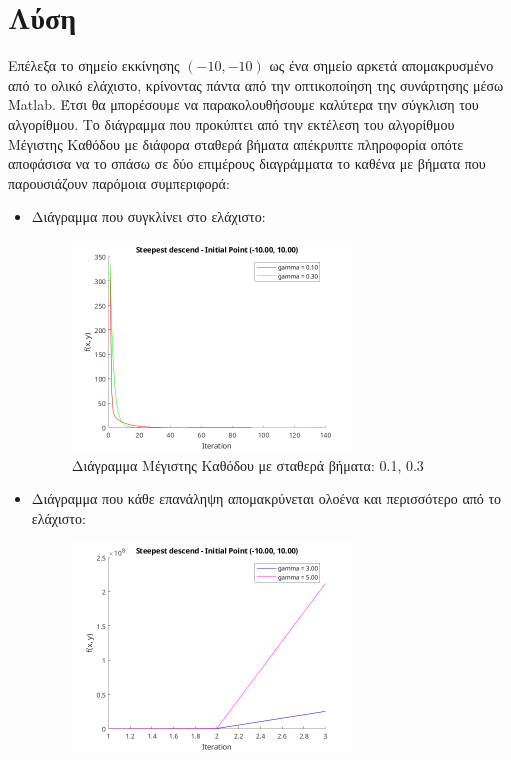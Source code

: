 \documentclass{report}
\begin{document}
\section{Λύση}
Επέλεξα το σημείο εκκίνησης $(-10,-10)$ ως ένα σημείο αρκετά απομακρυσμένο από το ολικό ελάχιστο, 
κρίνοντας πάντα από την οπτικοποίηση της συνάρτησης μέσω Matlab.
Έτσι θα μπορέσουμε να παρακολουθήσουμε καλύτερα την σύγκλιση του αλγορίθμου.
Το διάγραμμα που προκύπτει από την εκτέλεση του αλγορίθμου Μέγιστης Καθόδου με διάφορα σταθερά βήματα 
απέκρυπτε πληροφορία οπότε αποφάσισα να το σπάσω σε δύο επιμέρους διαγράμματα το καθένα με βήματα που
παρουσιάζουν παρόμοια συμπεριφορά:
\begin{itemize}
    \item Διάγραμμα που συγκλίνει στο ελάχιστο:
    \begin{figure}[H]
        \centering
        \includegraphics[width=0.7\textwidth]{media/thema1-1.png}
        \caption{Διάγραμμα Μέγιστης Καθόδου με σταθερά βήματα: 0.1, 0.3}
    \end{figure}
    \item Διάγραμμα που κάθε επανάληψη απομακρύνεται ολοένα και περισσότερο από το ελάχιστο:
    \begin{figure}[H]
        \centering
        \includegraphics[width=0.7\textwidth]{media/thema1-2.png}

\end{figure}
\end{itemize}
\end{document}
